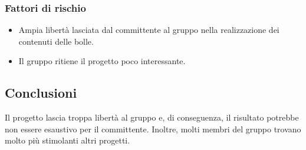 		\subsubsection {Fattori di rischio}
			\begin{itemize}
				\item Ampia libertà lasciata dal committente al gruppo nella realizzazione dei contenuti delle bolle.		
				\item Il gruppo ritiene il progetto poco interessante.
			\end{itemize}
	\subsection {Conclusioni}
		Il progetto lascia troppa libertà al gruppo e, di conseguenza, il risultato potrebbe non essere esaustivo per il committente. Inoltre, molti membri del gruppo trovano molto più stimolanti altri progetti.
	